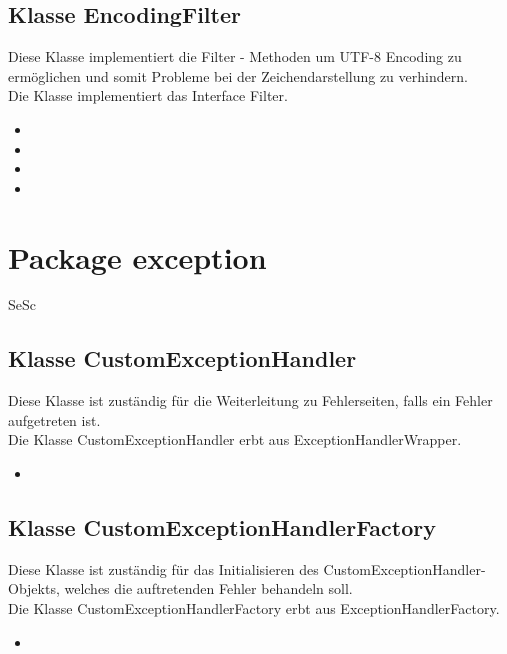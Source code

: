 	\subsection{Klasse EncodingFilter}
	Diese Klasse implementiert die Filter - Methoden um UTF-8 Encoding zu
	ermöglichen und somit Probleme bei der Zeichendarstellung zu verhindern.\\
	Die Klasse implementiert das Interface Filter.
	\begin{itemize}
		\item \override
		\item \override
		\item \override
		\item {}
	\end{itemize}
	
	\section{Package exception}
	\begin{tiny}
		SeSc
	\end{tiny}
	\subsection{Klasse CustomExceptionHandler}
	Diese Klasse ist zuständig für die Weiterleitung zu Fehlerseiten, falls ein Fehler aufgetreten
	ist. \\
	Die Klasse CustomExceptionHandler erbt aus ExceptionHandlerWrapper.
	\begin{itemize}
		\item \override
	\end{itemize}
	
	\subsection{Klasse CustomExceptionHandlerFactory}
	Diese Klasse ist zuständig für das  Initialisieren des CustomExceptionHandler-Objekts, welches die auftretenden Fehler behandeln soll.\\
	Die Klasse CustomExceptionHandlerFactory erbt aus ExceptionHandlerFactory.
	\begin{itemize}
		\item \override
	\end{itemize}
	
